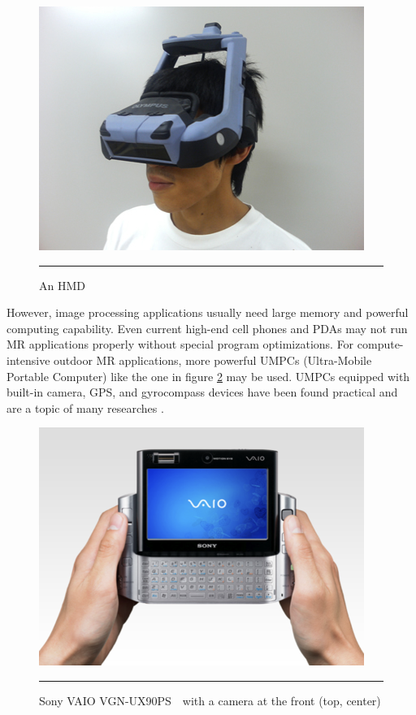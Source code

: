 \begin{figure}[htbp]
	\centering
	\includegraphics{./Primitives/hmd.jpg}
	\rule{35em}{0.5pt}
	\caption[An HMD]{An HMD}
	\label{fig:HMD}
\end{figure}

However, image processing applications usually need large memory and powerful computing capability. Even current high-end cell phones and PDAs may not run MR applications properly without special program optimizations. For compute-intensive outdoor MR applications, more powerful UMPCs (Ultra-Mobile Portable Computer) like the one in figure \ref{fig:VAIO} may be used. UMPCs equipped with built-in camera, GPS, and gyrocompass devices have been found practical and are a topic of many researches \citep{Reference2} \citep{Reference4} \citep{Reference13}.

\begin{figure}[htbp]
	\centering
	\includegraphics{./Primitives/vaio.png}
	\rule{35em}{0.5pt}
	\caption[Sony VAIO VGN-UX90PS with a camera at the front]{Sony VAIO VGN-UX90PS　with a camera at the front (top, center)}
	\label{fig:VAIO}
\end{figure}

